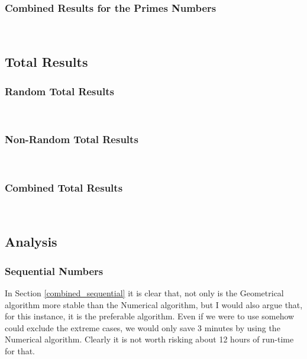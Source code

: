 \subsubsection{Combined Results for the Primes Numbers} 
\label{combined_prime}
\\


\subsection{Total Results}
\subsubsection{Random Total Results}

\\


\subsubsection{Non-Random Total Results}

\\


\subsubsection{Combined Total Results}
\label{total_combined_results} 
\\


\subsection{Analysis}

\subsubsection{Sequential Numbers}
In Section \ref{combined_sequential} it is clear that, not only is the Geometrical algorithm more stable than the Numerical algorithm, but I would also argue that, for this instance, it is the preferable algorithm. Even if we were to use somehow could exclude the extreme cases, we would only save 3 minutes by using the Numerical algorithm. Clearly it is not worth risking about 12 hours of run-time for that. 

